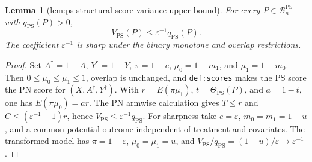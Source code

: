 \documentclass{article}
\newtheorem{lemma}{Lemma}
\begin{document}
\begin{lemma}[lem:ps-structural-score-variance-upper-bound]\label{lem:ps-structural-score-variance-upper-bound}
For every \(P\in\mathcal B_n^{\mathrm{PS}}\) with \(q_{\mathrm{PS}}(P)>0\),
\[V_{\mathrm{PS}}(P)\le\varepsilon^{-1}q_{\mathrm{PS}}(P).\]
The coefficient \(\varepsilon^{-1}\) is sharp under the binary monotone and overlap restrictions.
\end{lemma}
\begin{proof}
Set \(A^\dagger=1-A\), \(Y^\dagger=1-Y\), \(\pi=1-e\), \(\mu_0=1-m_1\), and \(\mu_1=1-m_0\). Then \(0\le\mu_0\le\mu_1\le1\), overlap is unchanged, and \texttt{def:scores} makes the PS score the PN score for \((X,A^\dagger,Y^\dagger)\). With \(r=E(\pi\mu_1)\), \(t=\Theta_{\mathrm{PS}}(P)\), and \(a=1-t\), one has \(E(\pi\mu_0)=ar\). The PN armwise calculation gives \(T\le r\) and \(C\le(\varepsilon^{-1}-1)r\), hence \(V_{\mathrm{PS}}\le\varepsilon^{-1}q_{\mathrm{PS}}\). For sharpness take \(e=\varepsilon\), \(m_0=m_1=1-u\), and a common potential outcome independent of treatment and covariates. The transformed model has \(\pi=1-\varepsilon\), \(\mu_0=\mu_1=u\), and \(V_{\mathrm{PS}}/q_{\mathrm{PS}}=(1-u)/\varepsilon\to\varepsilon^{-1}\).
\end{proof}
\end{document}
